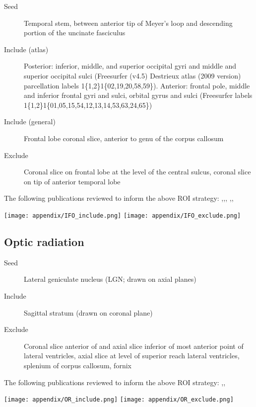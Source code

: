 \begin{description}
  \item[Seed] Temporal stem, between anterior tip of Meyer's loop and descending portion of the uncinate fasciculus
  \item[Include (atlas)] Posterior: inferior, middle, and superior occipital gyri and middle and superior occipital sulci (Freesurfer (v4.5) Destrieux atlas\autocite{Destrieux2010} (2009 version) parcellation labels 1\{1,2\}1\{02,19,20,58,59\}).
  Anterior: frontal pole, middle and inferior frontal gyri and sulci, orbital gyrus and sulci (Freesurfer labels 1\{1,2\}1\{01,05,15,54,12,13,14,53,63,24,65\})
  \item[Include (general)] Frontal lobe coronal slice, anterior to genu of the corpus callosum
  \item[Exclude] Coronal slice on frontal lobe at the level of the central sulcus, coronal slice on tip of anterior temporal lobe
\end{description}

The following publications reviewed to inform the above ROI strategy: \textcite{Martino2010},\textcite{Sarubbo2013},\textcite{Hau2016},
\textcite{Catani2008},\textcite{Wakana2007},\textcite{Wu2016}

\begin{figure*}[h]
  \centering
    \texttt{[image: appendix/IFO\_include.png]}
    \texttt{[image: appendix/IFO\_exclude.png]}
  \caption{Seed (yellow), inclusion (green) and exclusion (red) \glspl{roi} for the inferior fronto-occipital fasciculus}
  \label{fig:rois.ifo}
\end{figure*}

\subsection{Optic radiation}

\begin{description}
  \item[Seed] Lateral geniculate nucleus (LGN; drawn on axial planes)
  \item[Include] Sagittal stratum (drawn on coronal plane)
  \item[Exclude] Coronal slice anterior of and axial slice inferior of most anterior point of lateral ventricles, axial slice at level of superior reach lateral ventricles, splenium of corpus callosum, fornix
\end{description}

The following publications reviewed to inform the above ROI strategy:
\textcite{Yogarajah2009},\textcite{Hofer2010},\textcite{Dayan2015}

\begin{figure*}[h]
  \centering
    \texttt{[image: appendix/OR\_include.png]}
    \texttt{[image: appendix/OR\_exclude.png]}
  \caption{Seed (yellow), inclusion (green) and exclusion (red) regions of interest for the optic radiation}
  \label{fig:rois.or}
\end{figure*}
